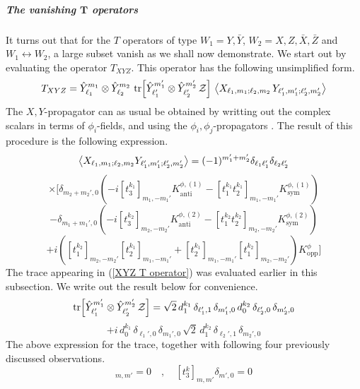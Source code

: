 \newpage
\subparagraph[The vanishing $T$ operators]{The vanishing $\mathbf{T}$ operators}
It turns out that for the $T$ operators of type $W_1 = Y, \bar{Y}$, $W_2 = X, Z, \bar{X}, \bar{Z}$ and $W_1 \leftrightarrow W_2$, a large subset vanish as we shall now demonstrate. We start out by evaluating the operator $T_{XYZ}$. This operator has the following unsimplified form.
%
%
\begin{equation}\label{XYZ T operator}
T_{XYZ} = \hat{Y}^{m_1}_{\ell_1} \otimes \hat{Y}^{m_2}_{\ell_2} \,
\tr[\hat{Y}^{m_1'}_{\ell_1'} \otimes \hat{Y}^{m_2'}_{\ell_2'} \, \mathcal{Z}] \,
\expval{X_{\ell_1, m_1; \ell_2, m_2} \, Y_{\ell_1', m_1'; \ell_2', m_2'}}
\end{equation}
%
%
The $X,Y$-propagator can as usual be obtained by writting out the complex scalars in terms of $\phi_i$-fields, and using the $\phi_i, \phi_j$-propagators \cite{One-point functions in D3-D7}. The result of this procedure is the following expression.
%
%
\begin{equation*}
\expval{
X_{\ell_1,m_1;\ell_2,m_2}
Y_{\ell_1',m_1';\ell_2',m_2'}
}
=
(-1)^{m_1' + m_2'} \delta_{\ell_1 \ell_1'} \delta_{\ell_2 \ell_2'}
\end{equation*}
%
%
\begin{equation*}
\times
\Bigg[
\delta_{m_2 + m_2',0}
\left(
-i [t_3^{k_1}]_{m_1,-m_1'} K^{\phi,(1)}_{\text{anti}}
- [t_1^{k_1} t_2^{k_1}]_{m_1,-m_1'} K^{\phi,(1)}_{\text{sym}}
\right)
\end{equation*}
%
%
\begin{equation*}
-
\delta_{m_1 + m_1',0}
\left(
-i [t_3^{k_2}]_{m_2,-m_2'} K^{\phi,(2)}_{\text{anti}}
- [t_1^{k_2} t_2^{k_2}]_{m_2,-m_2'} K^{\phi,(2)}_{\text{sym}}
\right)
\end{equation*}
%
%
\begin{equation}\label{XZ-propagator}
+ i \left(
[t_1^{k_2}]_{m_2,-m_2'} [t_2^{k_1}]_{m_1,-m_1'}
+
[t_2^{k_1}]_{m_1,-m_1'} [t_1^{k_2}]_{m_2,-m_2'}
\right)
K^{\phi}_{\text{opp}}
\Bigg]
\end{equation}
%
%
The trace appearing in (\ref{XYZ T operator}) was evaluated earlier in this subsection. We write out the result below for convenience.
%
%
\begin{equation*}
\tr[\hat{Y}_{\ell_1'}^{m_1'} \otimes \hat{Y}_{\ell_2'}^{m_2'} \, \mathcal{Z}]
=
\sqrt{2} \, d_1^{k_1} \, \delta_{\ell_1',1} \, \delta_{m_1',0} \,
d_0^{k_2} \, \delta_{\ell_2',0} \, \delta_{m_2',0}
\end{equation*}
%
%
\begin{equation}
+
i \, d_0^{k_1} \, \delta_{\ell_1',0} \, \delta_{m_1',0} \, 
\sqrt{2} \, d_1^{k_2} \, \delta_{\ell_2',1} \, \delta_{m_2',0}
\end{equation}
%
%
The above expression for the trace, together with following four previously discussed observations.
%
%
\begin{equation}
[t_i^{k = 1}]_{m,m'} = 0
%
\quad , \quad
%
[t_3^{k}]_{m,m'} \delta_{m',0} = 0
\end{equation}
%
%

